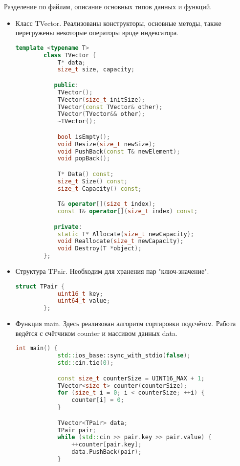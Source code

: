 \documentclass[12pt]{article}
\begin{document}
Разделение по файлам, описание основных типов данных и функций. \\
\begin{itemize}
    \item
        Класс TVector. Реализованы конструкторы, основные методы, также перегружены некоторые операторы вроде индексатора.
        \begin{lstlisting}[language=C++]
        template <typename T>
        class TVector {
            T* data;
            size_t size, capacity;

           public:
            TVector();
            TVector(size_t initSize);
            TVector(const TVector& other);
            TVector(TVector&& other);
            ~TVector();

            bool isEmpty();
            void Resize(size_t newSize);
            void PushBack(const T& newElement);
            void popBack();

            T* Data() const;
            size_t Size() const;
            size_t Capacity() const;

            T& operator[](size_t index);
            const T& operator[](size_t index) const;

           private:
            static T* Allocate(size_t newCapacity);
            void Reallocate(size_t newCapacity);
            void Destroy(T *object);
        };
        \end{lstlisting}
    \item
        Структура TPair. Необходим для хранения пар "ключ-значение".
        \begin{lstlisting}[language=C++]
        struct TPair {
            uint16_t key;
            uint64_t value;
        };
        \end{lstlisting}
    \item
        Функция main. Здесь реализован алгоритм сортировки подсчётом. Работа ведётся с счётчиком counter и массивом данных data.
        \begin{lstlisting}[language=C++]
        int main() {
            std::ios_base::sync_with_stdio(false);
            std::cin.tie(0);

            const size_t counterSize = UINT16_MAX + 1;
            TVector<size_t> counter(counterSize);
            for (size_t i = 0; i < counterSize; ++i) {
                counter[i] = 0;
            }

            TVector<TPair> data;
            TPair pair;
            while (std::cin >> pair.key >> pair.value) {
                ++counter[pair.key];
                data.PushBack(pair);
            }


\end{lstlisting}
\end{itemize}
\end{document}
